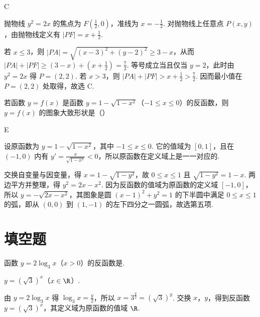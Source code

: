 \documentclass[UTF8,a4paper,oneside,11pt]{ctexbook}
\begin{document}
\begin{answer}
C
\end{answer}

\begin{solution}
抛物线 \(y^2=2x\) 的焦点为 \(F(\frac12,0)\)，准线为 \(x=-\frac12\). 对抛物线上任意点 \(P(x,y)\)，由抛物线定义有 \(|PF|=x+\frac12\).

若 \(x\leq3\)，则
\(|PA|=\sqrt{(x-3)^2+(y-2)^2}\geq3-x\)，从而
\(|PA|+|PF|\geq(3-x)+(x+\frac12)=\frac72\).
等号成立当且仅当 \(y=2\)，此时由 \(y^2=2x\) 得 \(P=(2,2)\). 若 \(x>3\)，则 \(|PA|+|PF|>x+\frac12>\frac72\). 因而最小值在 \(P=(2,2)\) 处取得，故选 C.
\end{solution}

\begin{problem}

若函数 \(y = f(x) \) 是函数 \(y = 1 - \sqrt{1 - x^2}\)（\(-1 \leq x \leq 0\)）的反函数，则 \(y = f(x) \) 的图象大致形状是（\quad）
\end{problem}

\begin{answer}
E
\end{answer}

\begin{solution}
设原函数为 \(y=1-\sqrt{1-x^2}\)，其中 \(-1\leq x\leq0\). 它的值域为 \([0,1]\)，且在 \((-1,0)\) 内有
\(y'=\frac{x}{\sqrt{1-x^2}}<0\)，所以原函数在定义域上是一一对应的.

交换自变量与因变量，得 \(x=1-\sqrt{1-y^2}\)，故 \(0\leq x\leq1\) 且 \(\sqrt{1-y^2}=1-x\). 两边平方并整理，得 \(y^2=2x-x^2\). 因为反函数的值域为原函数的定义域 \([-1,0]\)，所以 \(y=-\sqrt{2x-x^2}\)，其图象是圆 \((x-1)^2+y^2=1\) 的下半圆中满足 \(0\leq x\leq1\) 的弧，即从 \((0,0)\) 到 \((1,-1)\) 的左下四分之一圆弧，故选第五项.
\end{solution}

\section{填空题}

\begin{problem}

函数 \(y = 2 \log_{3} x\)（\(x > 0\)）的反函数是\fillinblank{}.
\end{problem}

\begin{answer}
\(y = (\sqrt{3})^x\)（\(x \in \R\)）.
\end{answer}

\begin{solution}
由 \(y=2\log_{3}x\) 得 \(\log_{3}x=\frac{y}{2}\)，所以 \(x=3^{\frac{y}{2}}=(\sqrt{3})^y\). 交换 \(x\)，\(y\)，得到反函数 \(y=(\sqrt{3})^x\)，其定义域为原函数的值域 \(\R\).
\end{solution}
\end{document}
